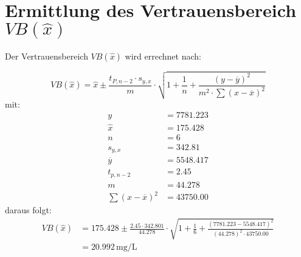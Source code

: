 \documentclass{article}
\begin{document}
\section{Ermittlung des Vertrauensbereich $ VB(\hat{x}) $}
\begin{flushleft}
  Der Vertrauensbereich $VB(\hat{x})$ wird errechnet nach:
\end{flushleft}
\begin{equation}
  VB(\hat{x}) = \hat{x} \pm \frac{t_{P,n-2} \cdot s _{y,x}}{m} \cdot \sqrt{1+\frac{1}{n}+\frac{(y-\overline{y})^2}{m^2 \cdot \sum (x -\overline{x})^2}}
\end{equation}
mit:
\begin{align*}
   y &= 7781.223 \\
   \hat{x} & = 175.428 \\
   n &= 6 \\
   s_{y,x} &= 342.81 \\
   \overline{y} & = 5548.417 \\
   t_{p,n-2} &= 2.45 \\
   m &= 44.278\\
   \sum (x -\overline{x})^2&= 43750.00
 \end{align*}
 daraus folgt:
\begin{align*}
   VB(\hat{x}) &= 175.428 \pm \frac{2.45 \cdot 342.801}{44.278} \cdot  \sqrt{1+\frac{1}{6}+\frac{(7781.223-5548.417)^2}{(44.278)^2 \cdot 43750.00 }}\\
    &=20.992 \, \si{\milli\gram\per\liter}
 \end{align*}


\end{document}

